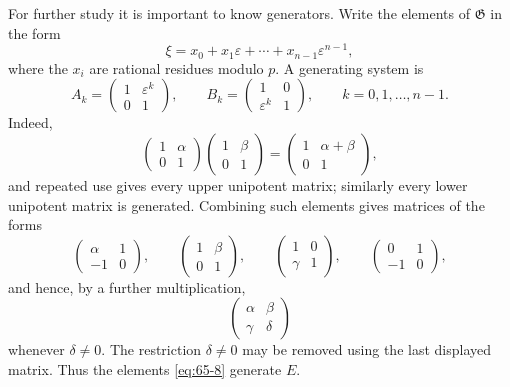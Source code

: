 \documentclass[11pt,a4paper]{article}
\begin{document}
For further study it is important to know generators.  Write the elements of \(\mathfrak G\) in the form
\begin{equation}\label{eq:65-7}
 \xi=x_0+x_1\varepsilon+\cdots+x_{n-1}\varepsilon^{n-1},
\end{equation}
where the \(x_i\) are rational residues modulo \(p\).  A generating system is
\begin{equation}\label{eq:65-8}
 A_k=\begin{pmatrix}1&\varepsilon^k\\0&1\end{pmatrix},
 \qquad
 B_k=\begin{pmatrix}1&0\\\varepsilon^k&1\end{pmatrix},
 \qquad k=0,1,\ldots,n-1.
\end{equation}
Indeed,
\[
 \begin{pmatrix}1&\alpha\\0&1\end{pmatrix}
 \begin{pmatrix}1&\beta\\0&1\end{pmatrix}
 =
 \begin{pmatrix}1&\alpha+\beta\\0&1\end{pmatrix},
\]
and repeated use gives every upper unipotent matrix; similarly every lower unipotent matrix is generated.  Combining such elements gives matrices of the forms
\[
 \begin{pmatrix}\alpha&1\\-1&0\end{pmatrix},
 \qquad
 \begin{pmatrix}1&\beta\\0&1\end{pmatrix},
 \qquad
 \begin{pmatrix}1&0\\\gamma&1\end{pmatrix},
 \qquad
 \begin{pmatrix}0&1\\-1&0\end{pmatrix},
\]
and hence, by a further multiplication,
\begin{equation}\label{eq:65-11}
 \begin{pmatrix}\alpha&\beta\\\gamma&\delta\end{pmatrix}
\end{equation}
whenever \(\delta\ne0\).  The restriction \(\delta\ne0\) may be removed using the last displayed matrix.  Thus the elements \eqref{eq:65-8} generate \(E\).
\end{document}
